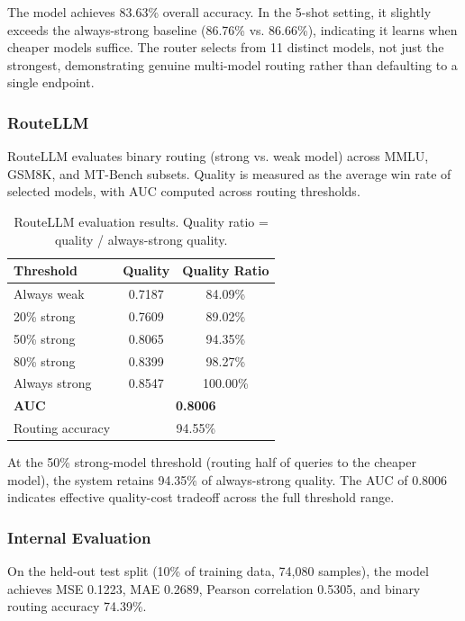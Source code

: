 The model achieves 83.63\% overall accuracy. In the 5-shot setting, it slightly exceeds the always-strong baseline (86.76\% vs. 86.66\%), indicating it learns when cheaper models suffice. The router selects from 11 distinct models, not just the strongest, demonstrating genuine multi-model routing rather than defaulting to a single endpoint.

\subsubsection{RouteLLM}

RouteLLM \citep{ong2024routellm} evaluates binary routing (strong vs. weak model) across MMLU, GSM8K, and MT-Bench subsets. Quality is measured as the average win rate of selected models, with AUC computed across routing thresholds.

\begin{table}[h]
\centering
\caption{RouteLLM evaluation results. Quality ratio = quality / always-strong quality.}
\label{tab:routellm_results}
\small
\begin{tabular}{lcc}
\toprule
\textbf{Threshold} & \textbf{Quality} & \textbf{Quality Ratio} \\
\midrule
Always weak & 0.7187 & 84.09\% \\
20\% strong & 0.7609 & 89.02\% \\
50\% strong & 0.8065 & 94.35\% \\
80\% strong & 0.8399 & 98.27\% \\
Always strong & 0.8547 & 100.00\% \\
\midrule
\textbf{AUC} & \multicolumn{2}{c}{\textbf{0.8006}} \\
Routing accuracy & \multicolumn{2}{c}{94.55\%} \\
\bottomrule
\end{tabular}
\end{table}

At the 50\% strong-model threshold (routing half of queries to the cheaper model), the system retains 94.35\% of always-strong quality. The AUC of 0.8006 indicates effective quality-cost tradeoff across the full threshold range.

\subsubsection{Internal Evaluation}

On the held-out test split (10\% of training data, 74,080 samples), the model achieves MSE 0.1223, MAE 0.2689, Pearson correlation 0.5305, and binary routing accuracy 74.39\%.

